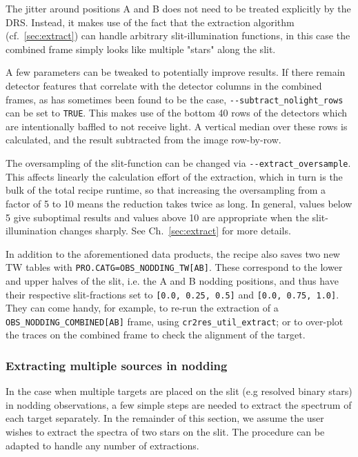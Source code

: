 The jitter around positions A and B does not need to be treated explicitly by
the DRS. Instead, it makes use of the fact that the extraction algorithm
(cf.~\ref{sec:extract}) can handle arbitrary slit-illumination functions, in
this case the combined frame simply looks like multiple "stars" along the slit.

A few parameters can be tweaked to potentially improve results. If there remain
detector features that correlate with the detector columns in the combined
frames, as has sometimes been found to be the case,
\verb!--subtract_nolight_rows! can be set to \verb!TRUE!. This makes use of the
bottom 40 rows of the detectors which are intentionally baffled to not receive
light. A vertical median over these rows is calculated, and the result subtracted
from the image row-by-row.

The oversampling of the slit-function can be changed via
\verb!--extract_oversample!. This affects linearly the calculation effort of the
extraction, which in turn is the bulk of the total recipe runtime, so that
increasing the oversampling from a factor of 5 to 10 means the reduction takes
twice as long. In general, values below 5 give suboptimal results and values
above 10 are appropriate when the slit-illumination changes sharply. See
Ch.~\ref{sec:extract} for more details.

In addition to the aforementioned data products, the recipe also saves two new
TW tables with \linebreak\verb!PRO.CATG=OBS_NODDING_TW[AB]!. These correspond to
the lower and upper halves of the slit, i.e. the A and B nodding positions, and
thus have their respective slit-fractions set to \verb![0.0, 0.25, 0.5]! and
\verb![0.0, 0.75, 1.0]!. They can come handy, for example, to re-run the
extraction of a \verb!OBS_NODDING_COMBINED[AB]! frame, using
\verb!cr2res_util_extract!; or to over-plot the traces on the combined frame to
check the alignment of the target.

\subsubsection{Extracting multiple sources in nodding}
\label{sec:slitfracbinary}
In the case when multiple targets are placed on the slit (e.g resolved binary
stars) in nodding observations, a few simple steps are needed to extract the spectrum 
of each target separately. In the remainder of this section, we assume the user 
wishes to extract the spectra of two stars on the slit. The procedure can be 
adapted to handle any number of extractions.
 
